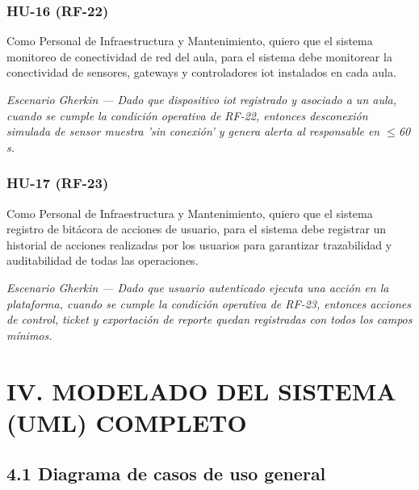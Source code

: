 \subsubsection*{HU-16 (RF-22)}


Como Personal de Infraestructura y Mantenimiento, quiero que el sistema monitoreo de conectividad de red del aula, para el sistema debe monitorear la conectividad de sensores, gateways y controladores iot instalados en cada aula.


\textit{Escenario }\textit{Gherkin}\textit{ --- Dado que dispositivo }\textit{iot}\textit{ registrado y asociado a un aula, cuando se cumple la condición operativa de RF-22, entonces desconexión simulada de sensor muestra 'sin conexión' y genera alerta al responsable en $\leq$60 s.}


\subsubsection*{HU-17 (RF-23)}


Como Personal de Infraestructura y Mantenimiento, quiero que el sistema registro de bitácora de acciones de usuario, para el sistema debe registrar un historial de acciones realizadas por los usuarios para garantizar trazabilidad y auditabilidad de todas las operaciones.


\textit{Escenario }\textit{Gherkin}\textit{ --- Dado que usuario autenticado ejecuta una acción en la plataforma, cuando se cumple la condición operativa de RF-23, entonces acciones de control, }\textit{ticket}\textit{ y exportación de reporte quedan registradas con todos los campos mínimos.}


\section*{IV. MODELADO DEL SISTEMA (UML) COMPLETO}


\subsection*{4.1 Diagrama de casos de uso general}


